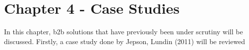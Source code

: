 \chapter{Chapter 4 - Case Studies}
In this chapter, \gls{b2b} solutions that have previously been under scrutiny will be discussed. Firstly, a case study done by Jepson, Lundin (2011) will be reviewed 
\section{}